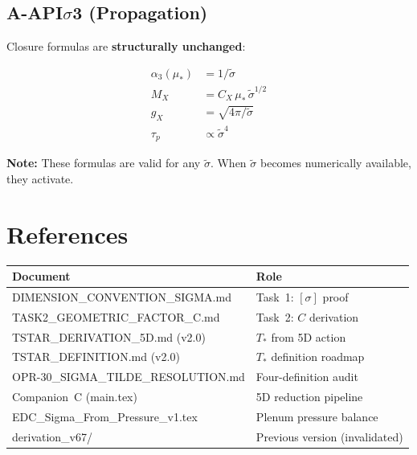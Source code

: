 \documentclass[11pt,a4paper]{article}
\theoremstyle{definition}
\theoremstyle{remark}
\begin{document}
\subsection{A-API$\sigma$3 (Propagation)}

Closure formulas are \textbf{structurally unchanged}:

\begin{align}
\alpha_3(\mu_*) &= 1/\tilde\sigma \label{eq:alpha3} \\
M_X &= C_X\,\mu_*\,\tilde\sigma^{1/2} \\
g_X &= \sqrt{4\pi/\tilde\sigma} \\
\tau_p &\propto \tilde\sigma^4
\end{align}

\textbf{Note:} These formulas are valid for any $\tilde\sigma$. When
$\tilde\sigma$ becomes numerically available, they activate.

\section{References}

\begin{center}
\begin{tabular}{ll}
\toprule
\textbf{Document} & \textbf{Role} \\
\midrule
DIMENSION\_CONVENTION\_SIGMA.md & Task~1: $[\sigma]$ proof \\
TASK2\_GEOMETRIC\_FACTOR\_C.md & Task~2: $C$ derivation \\
TSTAR\_DERIVATION\_5D.md (v2.0) & $T_*$ from 5D action \\
TSTAR\_DEFINITION.md (v2.0) & $T_*$ definition roadmap \\
OPR-30\_SIGMA\_TILDE\_RESOLUTION.md & Four-definition audit \\
Companion~C (main.tex) & 5D reduction pipeline \\
EDC\_Sigma\_From\_Pressure\_v1.tex & Plenum pressure balance \\
derivation\_v67/ & Previous version (invalidated) \\
\bottomrule
\end{tabular}
\end{center}
\end{document}
